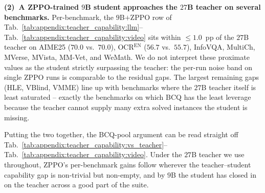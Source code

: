 \documentclass{llmxive}
\begin{document}
\textbf{(2)~A ZPPO-trained $9$B student approaches the $27$B teacher on several benchmarks.} Per-benchmark, the $9$B$+$ZPPO row of Tab.~\ref{tab:appendix:teacher_capability:llm}--Tab.~\ref{tab:appendix:teacher_capability:video} sits within ${\le}1.0$~pp of the $27$B teacher on AIME25 ($70.0$ vs.\ $70.0$), OCR$^\text{EN}$ ($56.7$ vs.\ $55.7$), InfoVQA, MultiCh, MVerse, MVista, MM-Vet, and WeMath. We do not interpret these proximate values as the student strictly surpassing the teacher: the per-run noise band on single ZPPO runs is comparable to the residual gaps. The largest remaining gaps (HLE, VBlind, VMME) line up with benchmarks where the $27$B teacher itself is least saturated -- exactly the benchmarks on which BCQ has the least leverage because the teacher cannot supply many extra solved instances the student is missing.

Putting the two together, the BCQ-pool argument can be read straight off Tab.~\ref{tab:appendix:teacher_capability:vs_teacher}--Tab.~\ref{tab:appendix:teacher_capability:video}. Under the $27$B teacher we use throughout, ZPPO's per-benchmark gains follow wherever the teacher--student capability gap is non-trivial but non-empty, and by $9$B the student has closed in on the teacher across a good part of the suite.
\end{document}
